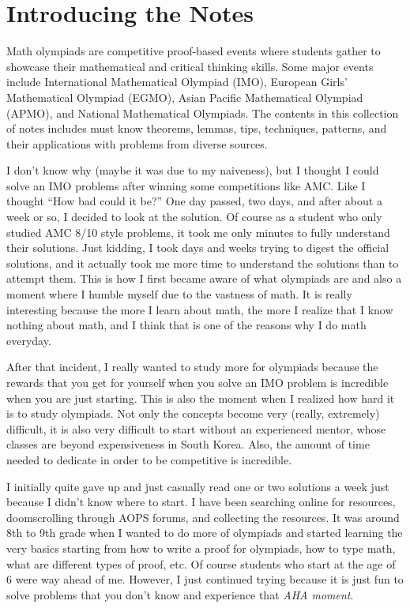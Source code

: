 \documentclass[../../../main.tex]{subfiles}
\begin{document}
\chapter*{Introducing the Notes}

Math olympiads are competitive proof-based events where students
gather to showcase their mathematical and critical thinking skills.
Some major events include International Mathematical Olympiad (IMO),
European Girls' Mathematical Olympiad (EGMO), Asian Pacific
Mathematical Olympiad (APMO), and National Mathematical Olympiads.
The contents in this collection of notes includes must know
theorems, lemmas, tips, techniques, patterns, and their applications
with problems from diverse sources.

I don't know why (maybe it was due to my naiveness), but I thought
I could solve an IMO problems after winning some competitions
like AMC. Like I thought ``How bad could it be?'' One day passed,
two days, and after about a week or so, I decided to look at the
solution. Of course as a student who only studied AMC 8/10 style
problems, it took me only minutes to fully understand their solutions.
Just kidding, I took days and weeks trying to digest the official
solutions, and it actually took me more time to understand the
solutions than to attempt them. This is how I first became aware of
what olympiads are and also a moment where I humble myself due to
the vastness of math. It is really interesting because the more I
learn about math, the more I realize that I know nothing about math,
and I think that is one of the reasons why I do math everyday.

After that incident, I really wanted to study more for olympiads
because the rewards that you get for yourself when you solve an
IMO problem is incredible when you are just starting. This is also
the moment when I realized how hard it is to study olympiads.
Not only the concepts become very (really, extremely) difficult,
it is also very difficult to start without an experienced mentor,
whose classes are beyond expensiveness in South Korea. Also,
the amount of time needed to dedicate in order to be competitive
is incredible.

I initially quite gave up and just casually read one or two solutions
a week just because I didn't know where to start. I have been
searching online for resources, doomscrolling through AOPS forums,
and collecting the resources. It was around 8th to 9th grade when I
wanted to do more of olympiads and started learning the very basics
starting from how to write a proof for olympiads, how to type math,
what are different types of proof, etc. Of course students who start
at the age of 6 were way ahead of me. However, I just continued trying
because it is just fun to solve problems that you don't know and
experience that \textit{AHA moment}.
\end{document}
